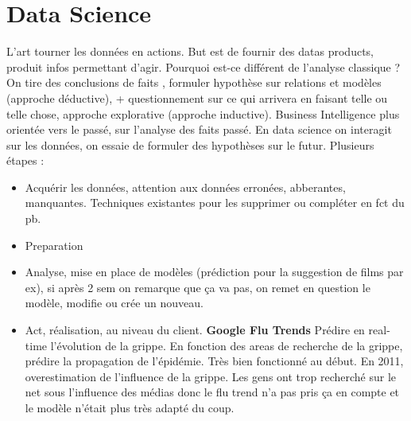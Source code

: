 \documentclass[10pt,a4paper]{article}
\begin{document}
\section{Data Science}
L'art tourner les données en actions. 
But est de fournir des datas products, produit infos permettant d'agir.  
Pourquoi est-ce différent de l'analyse classique ? 
On tire des conclusions de faits , formuler hypothèse sur relations et modèles (approche déductive), + questionnement sur ce qui arrivera en faisant telle ou telle chose, approche explorative (approche inductive).
Business Intelligence plus orientée vers le passé, sur l'analyse des faits passé. En data science on interagit sur les données, on essaie de formuler des hypothèses sur le futur. 
Plusieurs étapes :
\begin{itemize}
\item Acquérir les données, attention aux données erronées, abberantes, manquantes. Techniques existantes pour les supprimer ou compléter en fct du pb. 
\item Preparation
\item Analyse, mise en place de modèles (prédiction pour la suggestion de films par ex), si après 2 sem on remarque que ça va pas, on remet en question le modèle, modifie ou crée un nouveau. 
\item Act, réalisation, au niveau du client. 
\textbf{Google Flu Trends}
Prédire en real-time l'évolution de la grippe. En fonction des areas de recherche de la grippe, prédire la propagation de l'épidémie. 
Très bien fonctionné au début. En 2011, overestimation de l'influence de la grippe. Les gens ont trop recherché sur le net sous l'influence des médias donc le flu trend n'a pas pris ça en compte et le modèle n'était plus très adapté du coup.
\end{itemize}
\end{document}
